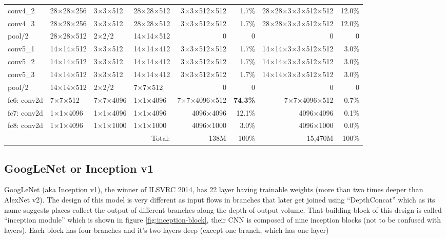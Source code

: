 \begin{landscape}
\begin{table*}
\begin{tabularx}{\hsize}{Xlllrrrr}
conv4\_2 & 28×28×256 & 3×3×512 & 28×28×512 & 3×3×512×512 & 1.7\% & 28×28×3×3×512×512 & 12.0\% \\
conv4\_3 & 28×28×256 & 3×3×512 & 28×28×512 & 3×3×512×512 & 1.7\% & 28×28×3×3×512×512 & 12.0\% \\
pool/2 & 28×28×512 & 2×2/2 & 14×14×512 & 0 & 0 & 0 & 0\\
conv5\_1 & 14×14×512 & 3×3×512 & 14×14×412 & 3×3×512×512 & 1.7\% & 14×14×3×3×512×512 & 3.0\% \\
conv5\_2 & 14×14×512 & 3×3×512 & 14×14×412 & 3×3×512×512 & 1.7\% & 14×14×3×3×512×512 & 3.0\% \\
conv5\_3 & 14×14×512 & 3×3×512 & 14×14×412 & 3×3×512×512 & 1.7\% & 14×14×3×3×512×512 & 3.0\% \\
pool/2 & 14×14×512 & 2×2/2 & 7×7×512 & 0 &  0 & 0 & 0 \\
fc6: conv2d & 7×7×512 & 7×7×4096 & 1×1×4096 & 7×7×4096×512 & \textbf{74.3\%} & 7×7×4096×512 & 0.7\% \\
fc7: conv2d & 1×1×4096 & 1×1×4096 & 1×1×4096 & 4096×4096 & 12.1\% & 4096×4096 & 0.1\% \\
fc8: conv2d & 1×1×4096 & 1×1×1000 & 1×1×1000 & 4096×1000 & 3.0\% & 4096×1000 & 0.0\% \\
\cmidrule{4-8}
\multicolumn{4}{r}{Total:} & 138M & 100\% & 15,470M & 100\% \\
\bottomrule
\end{tabularx}
\end{table*}
\end{landscape}
\clearpage


\subsection{GoogLeNet or Inception v1}\label{sec_inception_v1}
GoogLeNet (aka \href{https://github.com/google/inception/blob/master/inception.ipynb}{Inception} v1)\autocite{szegedy2015going}, the winner of ILSVRC 2014,
has 22 layer having trainable weights (more than two times deeper than AlexNet v2\autocite{krizhevsky2014one}).
The design of this model is very different as input flows in branches that later get joined using ``DepthConcat''
which as its name suggests places collect the output of different branches along the depth of output volume.
That building block of this design is called ``inception module'' which is shown in figure \ref{fig:inception-block},
their CNN is composed of nine inception blocks
(not to be confused with layers).
Each block has four branches and it's two layers deep (except one branch, which has one layer)

